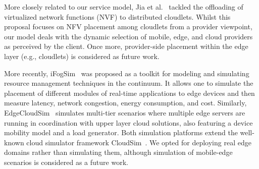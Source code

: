 More closely related to our service model, Jia et al.~\cite{Jia:2017} tackled the offloading of  virtualized network functions (NVF) to distributed cloudlets. Whilst this proposal focuses on NFV placement among cloudlets from a provider viewpoint, our model deals with the dynamic selection of mobile, edge, and cloud providers as perceived by the client. Once more, provider-side placement within the edge layer (e.g., cloudlets) is considered as future work. 











More recently, iFogSim~\cite{GuptaIfogSim17} was proposed as a toolkit for modeling and simulating resource management techniques in the continuum. It allows one to simulate the placement of different modules of real-time applications to edge devices and then measure latency, network congestion, energy consumption, and cost. Similarly, EdgeCloudSim~\cite{SonmezEgdeCloudSim17} simulates multi-tier scenarios where multiple edge servers are running in coordination with upper layer cloud solutions, also featuring a device mobility model and a load generator. Both simulation platforms extend the well-known cloud simulator framework CloudSim~\cite{calheiros2011cloudsim}. We opted for deploying real edge domains rather than simulating them, although simulation of mobile-edge scenarios is considered as a future work.

